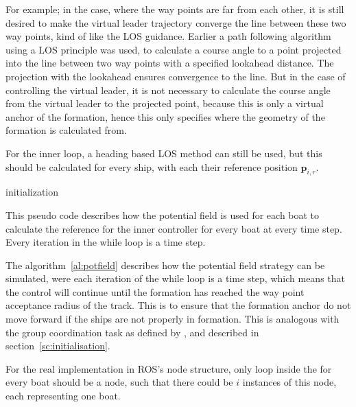 For example; in the case, where the way points are far from each
other, it is still desired to make the virtual leader trajectory
converge the line between these two way points, kind of like the
\ac{LOS} guidance. Earlier a path following algorithm using a \ac{LOS}
principle was used, to calculate a course angle to a point projected
into the line between two way points with a specified lookahead
distance. The projection with the lookahead ensures convergence to the
line. But in the case of controlling the virtual leader, it is not
necessary to calculate the course angle from the virtual leader to the
projected point, because this is only a virtual anchor of the
formation, hence this only specifies where the geometry of the
formation is calculated from. 

For the inner loop, a heading based \ac{LOS} method can still be used,
but this should be calculated for every ship, with each their
reference position $\mathbf{p}_{i,r}$.

\begin{algorithm}[H]
	initialization\;
	\caption{This pseudo code describes how the potential field is used
	for each boat to calculate the reference for the inner controller
	for every boat at every time step. Every iteration in the while loop
	is a time step.\vspace{6pt}}
	\label{al:potfield}
\end{algorithm}

The algorithm~\vref{al:potfield} describes how the potential field
strategy can be simulated, were each iteration of the while loop is a
time step, which means that the control will continue until the
formation has reached the way point acceptance radius of the track.
This is to ensure that the formation anchor do not move forward if the
ships are not properly in formation. This is analogous with the group
coordination task as defined by \citep{thorvaldsen}, and described in
section~\ref{sc:initialisation}.

For the real implementation in \ac{ROS}'s node structure, only loop
inside the for every boat should be a node, such that there could be
$i$ instances of this node, each representing one boat. 




